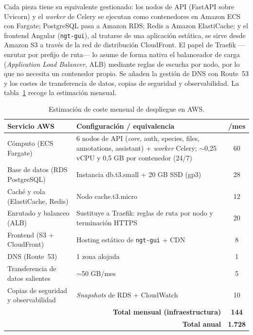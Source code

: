 Cada pieza tiene su equivalente gestionado: los nodos de API (FastAPI sobre
Uvicorn) y el \emph{worker} de Celery se ejecutan como contenedores en Amazon
ECS con Fargate; PostgreSQL pasa a Amazon RDS; Redis a Amazon ElastiCache; y el
frontend Angular (\texttt{ngt-gui}), al tratarse de una aplicación estática, se
sirve desde Amazon S3 a través de la red de distribución CloudFront. El papel de
Traefik ---enrutar por prefijo de ruta--- lo asume de forma nativa el
balanceador de carga (\emph{Application Load Balancer}, ALB) mediante reglas de
escucha por nodo, por lo que no necesita un contenedor propio. Se añaden la
gestión de DNS con Route~53 y los costes de transferencia de datos, copias de
seguridad y observabilidad. La tabla~\ref{tab:aws} recoge la estimación
mensual.

\begin{table}[!htbp]
\caption{Estimación de coste mensual de despliegue en AWS.}
\label{tab:aws}
\centering
\begin{tabular}{|p{4.4cm}|p{7.6cm}|c|}
\hline
\textbf{Servicio AWS} & \textbf{Configuración / equivalencia} & \textbf{\texteuro{}/mes} \\ \hline
Cómputo (ECS Fargate) & 6 nodos de API (\emph{core}, auth, species, files, annotations, assistant) + \emph{worker} Celery; $\sim$0,25 vCPU y 0,5 GB por contenedor (24/7) & 60 \\ \hline
Base de datos (RDS PostgreSQL) & Instancia db.t3.small + 20 GB SSD (gp3) & 28 \\ \hline
Caché y cola (ElastiCache, Redis) & Nodo cache.t3.micro & 12 \\ \hline
Enrutado y balanceo (ALB) & Sustituye a Traefik: reglas de ruta por nodo y terminación HTTPS & 20 \\ \hline
Frontend (S3 + CloudFront) & Hosting estático de \texttt{ngt-gui} + CDN & 8 \\ \hline
DNS (Route~53) & 1 zona alojada & 1 \\ \hline
Transferencia de datos salientes & $\sim$50 GB/mes & 5 \\ \hline
Copias de seguridad y observabilidad & \emph{Snapshots} de RDS + CloudWatch & 10 \\ \hline
\multicolumn{2}{|r|}{\textbf{Total mensual (infraestructura)}} & \textbf{144} \\ \hline
\multicolumn{2}{|r|}{\textbf{Total anual}} & \textbf{1.728} \\ \hline
\end{tabular}
\end{table}

